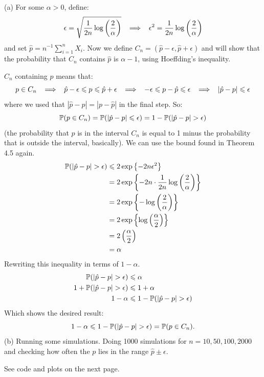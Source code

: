 \medskip\noindent(a) For some $\alpha > 0$, define:
$$
\epsilon = \sqrt{\frac{1}{2n}\log\left(\frac{2}{\alpha}\right)}
\imp
\epsilon^2 = \frac{1}{2n}\log\left(\frac{2}{\alpha}\right)
$$
and set $\hat{p} = n^{-1}\sum_{i=1}^n X_i$. Now we define
$C_n = (\hat{p} - \epsilon, \hat{p} + \epsilon)$ and will show that the probability that
$C_n$ contains $\hat{p}$ is $\alpha - 1$, using Hoeffding's inequality.

$C_n$ containing $p$ means that:
$$
p \in C_n \imp
\hat{p} - \epsilon \leq p \leq \hat{p} + \epsilon
\imp
-\epsilon \leq p - \hat{p} \leq \epsilon
\imp
|\hat{p} - p| \leq \epsilon
$$
where we used that $|\hat{p} - p| = |p - \hat{p}|$ in the final step. So:
$$
\P(p\in C_n) = \P(|\hat{p} - p| \leq \epsilon) = 1 - \P(|\hat{p} - p| > \epsilon)
$$
(the probability that $p$ is in the interval $C_n$ is equal to 1 minus the probability
that is outside the interval, basically). We can use the bound found in Theorem 4.5 again.
\begin{align*}
    \P(|\hat{p} - p| > \epsilon) &\leq
    2\exp\left\{-2n\epsilon^2\right\} \\
    &= 2\exp\left\{-2n\cdot\frac{1}{2n}\log\left(\frac{2}{\alpha}\right)\right\} \\
    &= 2\exp\left\{-\log\left(\frac{2}{\alpha}\right)\right\} \\
    &= 2\exp\left\{\log\left(\frac{\alpha}{2}\right)\right\}\\
    &= 2\left(\frac{\alpha}{2}\right) \\
    &= \alpha
\end{align*}
Rewriting this inequality in terms of $1-\alpha$.
\begin{align*}
    \P(|\hat{p} - p| > \epsilon) &\leq \alpha \\
    1 + \P(|\hat{p} - p| > \epsilon) &\leq 1 + \alpha \\
    1 - \alpha &\leq 1 - \P(|\hat{p} - p| > \epsilon)
\end{align*}
Which shows the desired result:
$$
1 - \alpha \leq 1 - \P(|\hat{p} - p| > \epsilon) = \P(p\in C_n).
$$
(b) Running some simulations. Doing 1000 simulations for $n=10, 50, 100, 2000$
and checking how often the $p$ lies in the range $\hat{p}\pm\epsilon$.

See code and plots on the next page.

\newpage\noindent

